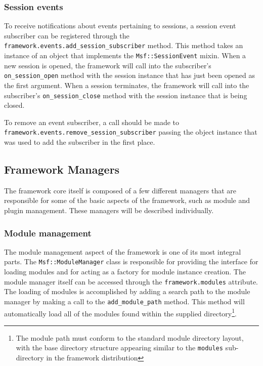 \documentclass{report}
\begin{document}
            \subsubsection{Session events}

\par
To receive notifications about events pertaining to sessions, a
session event subscriber can be registered through the
\texttt{framework.events.add\_session\_subscriber} method.  This
method takes an instance of an object that implements the
\texttt{Msf::SessionEvent} mixin.  When a new session is opened, the
framework will call into the subscriber's \texttt{on\_session\_open}
method with the session instance that has just been opened as the
first argument.  When a session terminates, the framework will call
into the subscriber's \texttt{on\_session\_close} method with the
session instance that is being closed.

\par
To remove an event subscriber, a call should be made to\\
\texttt{framework.events.remove\_session\_subscriber} passing the
object instance that was used to add the subscriber in the first
place.

        \subsection{Framework Managers}

\par
The framework core itself is composed of a few different managers
that are responsible for some of the basic aspects of the framework,
such as module and plugin management.  These managers will be
described individually.

            \subsubsection{Module management}

\par
The module management aspect of the framework is one of its most
integral parts.  The \texttt{Msf::ModuleManager} class is
responsible for providing the interface for loading modules and for
acting as a factory for module instance creation.  The module
manager itself can be accessed through the
\texttt{framework.modules} attribute.  The loading of modules is
accomplished by adding a search path to the module manager by making
a call to the \texttt{add\_module\_path} method.  This method will
automatically load all of the modules found within the supplied
directory\footnote{The module path must conform to the standard
module directory layout, with the base directory structure appearing
similar to the \texttt{modules} sub-directory in the framework
distribution}.
\end{document}
